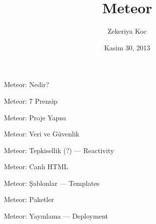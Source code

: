 \documentclass{beamer}
\title[Meteor 101]{Meteor}
\author{Zekeriya Koc}
\institute{Metglobal}
\date{Kasim 30, 2013}
\begin{document}
    \begin{frame}
        \titlepage{}
    \end{frame}

    \begin{frame}{Meteor: Nedir?}
    \end{frame}

    \begin{frame}{Meteor: 7 Prensip}
    \end{frame}

    \begin{frame}{Meteor: Proje Yap{\i}s{\i}}
    \end{frame}

    \begin{frame}{Meteor: Veri ve G\"uvenlik}
    \end{frame}

    \begin{frame}{Meteor: Tepkisellik (?) --- Reactivity}
    \end{frame}

    \begin{frame}{Meteor: Canl{\i} HTML}
    \end{frame}

    \begin{frame}{Meteor: \c{S}ablonlar --- Templates}
    \end{frame}

    \begin{frame}{Meteor: Paketler}
    \end{frame}

    \begin{frame}{Meteor: Yay{\i}nlama --- Deployment}
    \end{frame}
\end{document}
